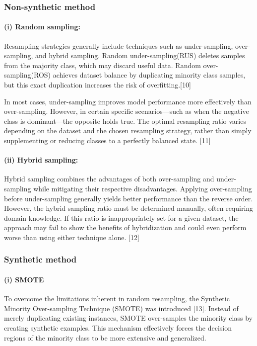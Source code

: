 \documentclass[sigconf]{acmart}
\begin{document}
\subsubsection{Non-synthetic method}
\paragraph{(i) Random sampling:} 
Resampling strategies generally include techniques such as under-sampling, over-sampling, and hybrid sampling. Random under-sampling(RUS) deletes samples from the majority class, which may discard useful data. Random over-sampling(ROS) achieves dataset balance by duplicating minority class samples, but this exact duplication increases the risk of overfitting.[10] 

In most cases, under-sampling improves model performance more effectively than over-sampling. However, in certain specific scenarios---such as when the negative class is dominant---the opposite holds true. The optimal resampling ratio varies depending on the dataset and the chosen resampling strategy, rather than simply supplementing or reducing classes to a perfectly balanced state. [11] 

\paragraph{(ii) Hybrid sampling:} Hybrid sampling combines the advantages of both over-sampling and under-sampling while mitigating their respective disadvantages. Applying over-sampling before under-sampling generally yields better performance than the reverse order. However, the hybrid sampling ratio must be determined manually, often requiring domain knowledge. If this ratio is inappropriately set for a given dataset, the approach may fail to show the benefits of hybridization and could even perform worse than using either technique alone. [12] 
%

\subsubsection{Synthetic method}
\paragraph{(i) SMOTE} 
To overcome the limitations inherent in random resampling, the Synthetic Minority Over-sampling Technique (SMOTE) was introduced [13]. Instead of merely duplicating existing instances, SMOTE over-samples the minority class by creating synthetic examples. This mechanism effectively forces the decision regions of the minority class to be more extensive and generalized. 
\end{document}
